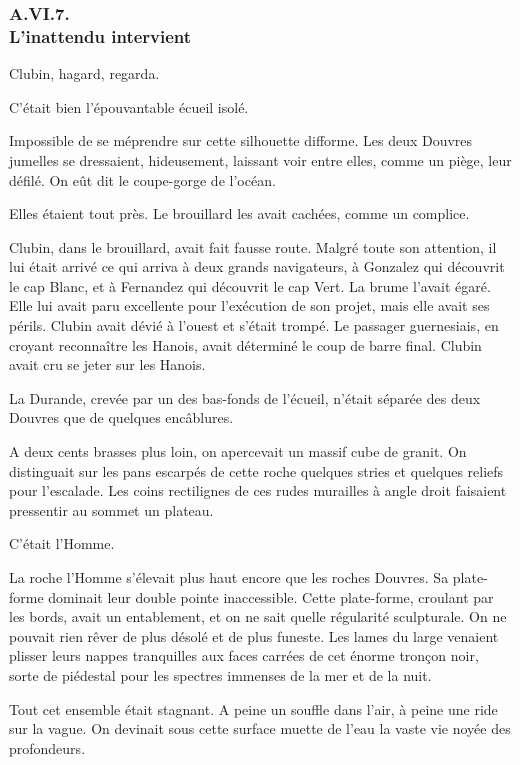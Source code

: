 \documentclass[french,twoside]{book} %
\begin{document}
 \subsubsection[{A.VI.7. L’inattendu intervient}]{A.VI.7. \\
L’inattendu intervient}
\noindent Clubin, hagard, regarda.\par
C’était bien l’épouvantable écueil isolé.\par
Impossible de se méprendre sur cette silhouette difforme. Les deux Douvres jumelles se dressaient, hideusement, laissant voir entre elles, comme un piège, leur défilé. On eût dit le coupe-gorge de l’océan.\par
Elles étaient tout près. Le brouillard les avait cachées, comme un complice.\par
Clubin, dans le brouillard, avait fait fausse route. Malgré toute son attention, il lui était arrivé ce qui arriva à deux grands navigateurs, à Gonzalez qui découvrit le cap Blanc, et à Fernandez qui découvrit le cap Vert. La brume l’avait égaré. Elle lui avait paru excellente pour l’exécution de son projet, mais elle avait ses périls. Clubin avait dévié à l’ouest et s’était trompé. Le passager guernesiais, en croyant reconnaître les Hanois, avait déterminé le coup de barre final. Clubin avait cru se jeter sur les Hanois.\par
La Durande, crevée par un des bas-fonds de l’écueil, n’était séparée des deux Douvres que de quelques encâblures.\par
 A deux cents brasses plus loin, on apercevait un massif cube de granit. On distinguait sur les pans escarpés de cette roche quelques stries et quelques reliefs pour l’escalade. Les coins rectilignes de ces rudes murailles à angle droit faisaient pressentir au sommet un plateau.\par
C’était l’Homme.\par
La roche l’Homme s’élevait plus haut encore que les roches Douvres. Sa plate-forme dominait leur double pointe inaccessible. Cette plate-forme, croulant par les bords, avait un entablement, et on ne sait quelle régularité sculpturale. On ne pouvait rien rêver de plus désolé et de plus funeste. Les lames du large venaient plisser leurs nappes tranquilles aux faces carrées de cet énorme tronçon noir, sorte de piédestal pour les spectres immenses de la mer et de la nuit.\par
Tout cet ensemble était stagnant. A peine un souffle dans l’air, à peine une ride sur la vague. On devinait sous cette surface muette de l’eau la vaste vie noyée des profondeurs.\par
\end{document}
